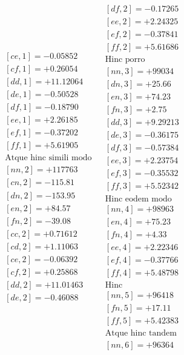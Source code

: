 {\[\begin{array}{lll}
\begin{gathered}{}
[ce,1]=-0.05852\\
[cf,1]=+0.26054\\
[dd,1]=+11.12064\\
[de,1]=-0.50528\\
[df,1]=-0.18790\\
[ee,1]=+2.26185\\
[ef,1]=-0.37202\\
[ff,1]=+5.61905\\[3pt]
\text{Atque hinc simili modo}\\[3pt]
[nn,2]=+117763\\
[cn,2]=-115.81\\
[dn,2]=-153.95\\
[en,2]=+84.57\\
[fn,2]=-39.08\\
[cc,2]=+0.71612\\
[cd,2]=+1.11063\\
[ce,2]=-0.06392\\
[cf,2]=+0.25868\\
[dd,2]=+11.01463\\
[de,2]=-0.46088
\end{gathered}&
\begin{gathered}{}
[df,2]=-0.17265\\
[ee,2]=+2.24325\\
[ef,2]=-0.37841\\
[ff,2]=+5.61686\\[3pt]
\text{Hinc porro}\\[3pt]
[nn,3]=+99034\\
[dn,3]=+25.66\\
[en,3]=+74.23\\
[fn,3]=+2.75\\
[dd,3]=+9.29213\\
[de,3]=-0.36175\\
[df,3]=-0.57384\\
[ee,3]=+2.23754\\
[ef,3]=-0.35532\\
[ff,3]=+5.52342\\[3pt]
\text{Hinc eodem modo}\\[3pt]
[nn,4]=+98963\\
[en,4]=+75.23\\
[fn,4]=+4.33\\
[ee,4]=+2.22346\\
[ef,4]=-0.37766\\
[ff,4]=+5.48798\\[3pt]
\text{Hinc}\\[3pt]
[nn,5]=+96418\\
[fn,5]=+17.11\\
[ff,5]=+5.42383\\[3pt]
\text{Atque hinc tandem}\\[3pt]
[nn,6]=+96364
\end{gathered}
\end{array}
\]
}

